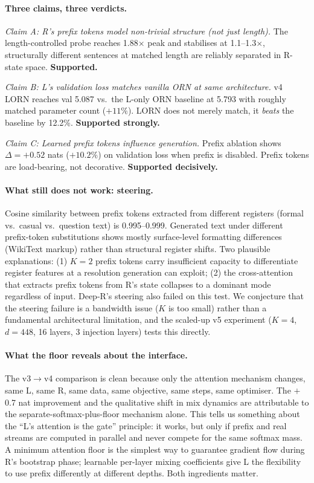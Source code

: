 \documentclass[11pt, a4paper]{article}
\theoremstyle{plain}
\theoremstyle{definition}
\theoremstyle{remark}
\begin{document}
\paragraph{Three claims, three verdicts.}

\textit{Claim A: R's prefix tokens model non-trivial structure (not just length).}
The length-controlled probe reaches 1.88$\times$ peak and stabilises at 1.1--1.3$\times$, structurally different sentences at matched length are reliably separated in R-state space. \textbf{Supported.}

\textit{Claim B: L's validation loss matches vanilla ORN at same architecture.}
v4 LORN reaches val 5.087 vs.\ the L-only ORN baseline at 5.793 with roughly matched parameter count ($+11\%$). LORN does not merely match, it \emph{beats} the baseline by 12.2\%. \textbf{Supported strongly.}

\textit{Claim C: Learned prefix tokens influence generation.}
Prefix ablation shows $\Delta = +0.52$ nats ($+10.2\%$) on validation loss when prefix is disabled. Prefix tokens are load-bearing, not decorative. \textbf{Supported decisively.}

\paragraph{What still does not work: steering.}
Cosine similarity between prefix tokens extracted from different registers (formal vs.\ casual vs.\ question text) is 0.995--0.999.
Generated text under different prefix-token substitutions shows mostly surface-level formatting differences (WikiText markup) rather than structural register shifts.
Two plausible explanations: (1) $K{=}2$ prefix tokens carry insufficient capacity to differentiate register features at a resolution generation can exploit; (2) the cross-attention that extracts prefix tokens from R's state collapses to a dominant mode regardless of input.
Deep-R's steering also failed on this test.
We conjecture that the steering failure is a bandwidth issue ($K$ is too small) rather than a fundamental architectural limitation, and the scaled-up v5 experiment ($K{=}4$, $d{=}448$, 16 layers, 3 injection layers) tests this directly.

\paragraph{What the floor reveals about the interface.}
The v3$\to$v4 comparison is clean because only the attention mechanism changes, same L, same R, same data, same objective, same steps, same optimiser.
The $+$0.7 nat improvement and the qualitative shift in mix dynamics are attributable to the separate-softmax-plus-floor mechanism alone.
This tells us something about the ``L's attention is the gate'' principle: it works, but only if prefix and real streams are computed in parallel and never compete for the same softmax mass.
A minimum attention floor is the simplest way to guarantee gradient flow during R's bootstrap phase; learnable per-layer mixing coefficients give L the flexibility to use prefix differently at different depths.
Both ingredients matter.
\end{document}
